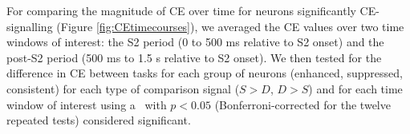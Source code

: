 For comparing the magnitude of CE over time for neurons significantly CE-signalling (Figure \ref{fig:CEtimecourses}), we averaged the CE values over two time windows of interest: the S2 period (0 to 500 ms relative to S2 onset) and the post-S2 period (500 ms to 1.5 s relative to S2 onset).
We then tested for the difference in CE between tasks for each group of neurons (enhanced, suppressed, consistent) for each type of comparison signal ($S>D$, $D>S$) and for each time window of interest using a \kst\ with $p<0.05$ (Bonferroni-corrected for the twelve repeated tests) considered significant.